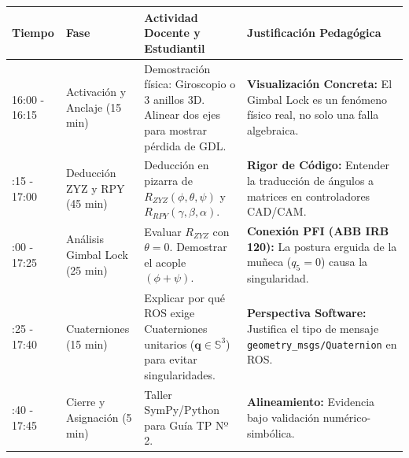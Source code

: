 \documentclass[11pt, a4paper]{article}
\begin{document}
\noindent
\begin{tabularx}{\textwidth}{@{} l >{\raggedright\arraybackslash}p{3.2cm} X X @{}}
\toprule
\textbf{Tiempo} & \textbf{Fase} & \textbf{Actividad Docente y Estudiantil} & \textbf{Justificación Pedagógica} \\ \midrule
16:00 - 16:15 & Activación y Anclaje \newline (15 min) & Demostración física: Giroscopio o 3 anillos 3D. Alinear dos ejes para mostrar pérdida de GDL. & \textbf{Visualización Concreta:} El Gimbal Lock es un fenómeno físico real, no solo una falla algebraica. \\ \addlinespace
16:15 - 17:00 & Deducción ZYZ y RPY \newline (45 min) & Deducción en pizarra de $R_{ZYZ}(\phi, \theta, \psi)$ y $R_{RPY}(\gamma, \beta, \alpha)$. & \textbf{Rigor de Código:} Entender la traducción de ángulos a matrices en controladores CAD/CAM. \\ \addlinespace
17:00 - 17:25 & Análisis Gimbal Lock \newline (25 min) & Evaluar $R_{ZYZ}$ con $\theta = 0$. Demostrar el acople $(\phi + \psi)$. & \textbf{Conexión PFI (ABB IRB 120):} La postura erguida de la muñeca ($q_5=0$) causa la singularidad. \\ \addlinespace
17:25 - 17:40 & Cuaterniones \newline (15 min) & Explicar por qué ROS exige Cuaterniones unitarios ($\mathbf{q} \in \mathbb{S}^3$) para evitar singularidades. & \textbf{Perspectiva Software:} Justifica el tipo de mensaje \texttt{geometry\_msgs/Quaternion} en ROS. \\ \addlinespace
17:40 - 17:45 & Cierre y Asignación \newline (5 min) & Taller SymPy/Python para Guía TP Nº 2. & \textbf{Alineamiento:} Evidencia bajo validación numérico-simbólica. \\ \bottomrule
\end{tabularx}
\end{document}
